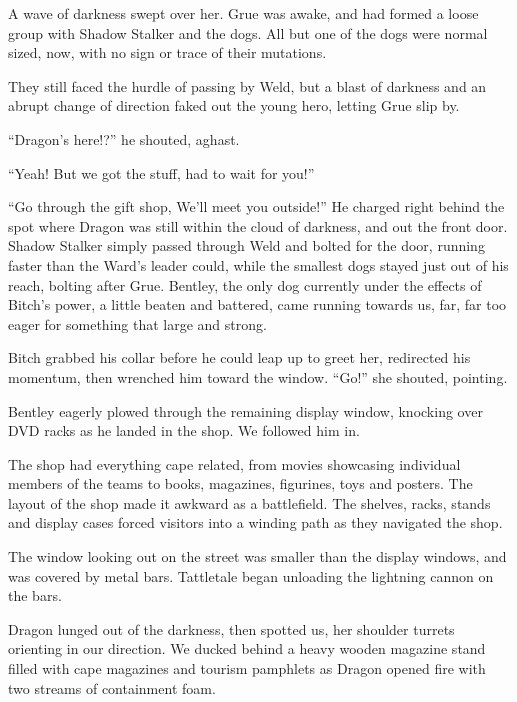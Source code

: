 A wave of darkness swept over her.  Grue was awake, and had formed a loose group with Shadow Stalker and the dogs.  All but one of the dogs were normal sized, now, with no sign or trace of their mutations.



They still faced the hurdle of passing by Weld, but a blast of darkness and an abrupt change of direction faked out the young hero, letting Grue slip by.



``Dragon's here!?'' he shouted, aghast.



``Yeah!  But we got the stuff, had to wait for you!''



``Go through the gift shop, We'll meet you outside!''  He charged right behind the spot where Dragon was still within the cloud of darkness, and out the front door.  Shadow Stalker simply passed through Weld and bolted for the door, running faster than the Ward's leader could, while the smallest dogs stayed just out of his reach, bolting after Grue.  Bentley, the only dog currently under the effects of Bitch's power, a little beaten and battered, came running towards us, far, far too eager for something that large and strong.



Bitch grabbed his collar before he could leap up to greet her, redirected his momentum, then wrenched him toward the window.  ``Go!'' she shouted, pointing.



Bentley eagerly plowed through the remaining display window, knocking over DVD racks as he landed in the shop.  We followed him in.



The shop had everything cape related, from movies showcasing individual members of the teams to books, magazines, figurines, toys and posters.  The layout of the shop made it awkward as a battlefield.  The shelves, racks, stands and display cases forced visitors into a winding path as they navigated the shop.



The window looking out on the street was smaller than the display windows, and was covered by metal bars.  Tattletale began unloading the lightning cannon on the bars.



Dragon lunged out of the darkness, then spotted us, her shoulder turrets orienting in our direction.  We ducked behind a heavy wooden magazine stand filled with cape magazines and tourism pamphlets as Dragon opened fire with two streams of containment foam.



